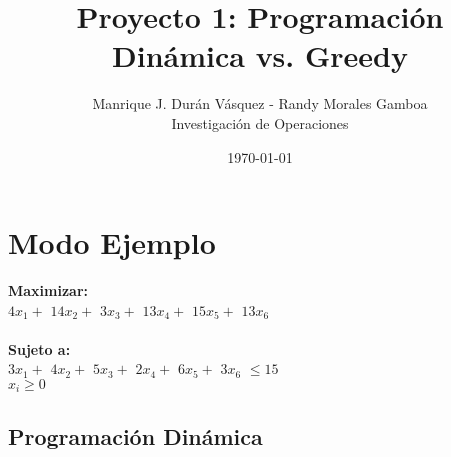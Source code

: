\documentclass[12pt]{article}
\title{Proyecto 1: Programaci\'on Din\'amica vs. Greedy}
\author{Manrique J. Dur\'an V\'asquez - Randy Morales Gamboa\\Investigaci\'on de Operaciones\\}
\date{\today}
\newcommand\tab[1][1cm]{\hspace*{#1}}
\begin{document}
\maketitle
\pagebreak

\section*{Modo Ejemplo}

\textbf{Maximizar:} \\
\tab$4x_{1} + $ $14x_{2} + $ $3x_{3} + $ $13x_{4} + $ $15x_{5} + $ $13x_{6}   $ \\\\
\textbf{Sujeto a:}\\
\tab$3x_{1} + $ $4x_{2} + $ $5x_{3} + $ $2x_{4} + $ $6x_{5} + $ $3x_{6}   $ $\leq 15$\\
\tab$x_i \geq 0$\subsection*{Programaci\'on Din\'amica}
\end{document}
